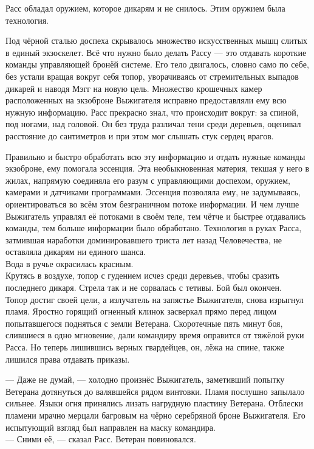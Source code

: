 Расс обладал оружием, которое дикарям и не снилось. Этим оружием была 
технология.

Под чёрной сталью доспеха скрывалось множество искусственных мышц слитых в 
единый экзоскелет. Всё что нужно было делать Рассу --- это отдавать короткие 
команды управляющей бронёй системе. Его тело двигалось, словно само по себе, без 
устали вращая вокруг себя топор, уворачиваясь от стремительных выпадов дикарей и 
наводя Мэгг на новую цель. Множество крошечных камер расположенных на экзоброне 
Выжигателя исправно предоставляли ему всю нужную информацию. Расс прекрасно 
знал, что происходит вокруг: за спиной, под ногами, над головой. Он без труда 
различал тени среди деревьев, оценивал расстояние до сантиметров и при этом мог 
слышать стук сердец врагов.

Правильно и быстро обработать всю эту информацию и отдать нужные команды 
экзоброне, ему помогала эссенция. Эта необыкновенная материя, текшая у него в 
жилах, напрямую соединяла его разум с управляющими доспехом, оружием, камерами и 
датчиками программами. Эссенция позволяла ему, не задумываясь, ориентироваться 
во всём этом безграничном потоке информации. И чем лучше Выжигатель управлял её 
потоками в своём теле, тем чётче и быстрее отдавались команды, тем больше 
информации было обработано. Технология в руках Расса, затмившая наработки 
доминировавшего триста лет назад Человечества, не оставляла дикарям ни единого 
шанса.\\

Вода в ручье окрасилась красным.\\

Крутясь в воздухе, топор с гудением исчез среди деревьев, чтобы сразить 
последнего дикаря. Стрела так и не сорвалась с тетивы. Бой был окончен.\\

Топор достиг своей цели, а излучатель на запястье Выжигателя, снова изрыгнул 
пламя. Яростно горящий огненный клинок засверкал прямо перед лицом попытавшегося 
подняться с земли Ветерана. Скоротечные пять минут боя, слившиеся в одно 
мгновение, дали командиру время оправится от тяжёлой руки Расса. Но теперь 
лишившись верных гвардейцев, он, лёжа на спине, также лишился права отдавать 
приказы.

\noindent --- Даже не думай, --- холодно произнёс Выжигатель, заметивший 
попытку Ветерана дотянуться до валявшейся рядом винтовки. Пламя послушно 
запылало сильнее. Языки огня принялись лизать нагрудную пластину Ветерана. 
Отблески пламени мрачно мерцали багровым на чёрно серебряной броне Выжигателя. 
Его испытующий взгляд был направлен на маску командира.\\
--- Сними её, --- сказал Расс. Ветеран повиновался.

